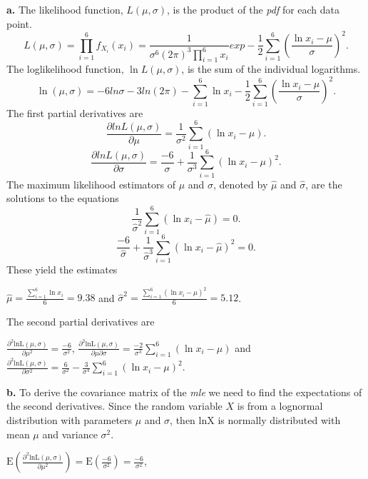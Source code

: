 \documentclass[]{book}
\theoremstyle{definition}
\theoremstyle{definition}
\theoremstyle{definition}
\theoremstyle{remark}
\begin{document}
\textbf{a.} The likelihood function, \(L\left( \mu,\sigma \right)\), is
the product of the \emph{pdf} for each data point.
\[L\left( \mu,\sigma \right) = \prod_{i = 1}^{6}{f_{X_{i}}\left( x_{i} \right)} = \frac{1}{\sigma^{6}\left( 2\pi \right)^{3}\prod_{i = 1}^{6}x_{i}}exp - \frac{1}{2}\sum_{i = 1}^{6}\left( \frac{\ln x_{i} - \mu}{\sigma} \right)^{2}.\]
The loglikelihood function, \(\ln L \left( \mu,\sigma \right)\), is the
sum of the individual logarithms.
\[\ln \left( \mu,\sigma \right) = - 6ln\sigma - 3ln\left( 2\pi \right) - \sum_{i = 1}^{6}\ln x_{i} - \frac{1}{2}\sum_{i = 1}^{6}\left( \frac{\ln x_{i} - \mu}{\sigma} \right)^{2}.\]
The first partial derivatives are
\[\frac{\partial lnL\left( \mu,\sigma \right)}{\partial\mu} = \frac{1}{\sigma^{2}}\sum_{i = 1}^{6}\left( \ln x_{i} - \mu \right).\]
\[\frac{\partial lnL\left( \mu,\sigma \right)}{\partial\sigma} = \frac{- 6}{\sigma} + \frac{1}{\sigma^{3}}\sum_{i = 1}^{6}\left( \ln x_{i} - \mu \right)^{2}.\]
The maximum likelihood estimators of \(\mu\) and \(\sigma\), denoted by
\(\hat{\mu}\) and \(\hat{\sigma}\), are the solutions to the equations
\[\frac{1}{{\hat{\sigma}}^{2}}\sum_{i = 1}^{6}\left( \ln x_{i} - \hat{\mu} \right) = 0.\]
\[\frac{- 6}{\hat{\sigma}} + \frac{1}{{\hat{\sigma}}^{3}}\sum_{i = 1}^{6}\left( \ln x_{i} - \hat{\mu} \right)^{2} = 0.\]
These yield the estimates

\(\hat{\mu} = \frac{\sum_{i = 1}^{6}{\ln x_{i}}}{6} = 9.38\) and
\({\hat{\sigma}}^{2} = \frac{\sum_{i = 1}^{6}\left( \ln x_{i} - \hat{\mu} \right)^{2}}{6} = 5.12\).

The second partial derivatives are

\(\frac{\partial^{2}\text{lnL}\left( \mu,\sigma \right)}{\partial\mu^{2}} = \frac{- 6}{\sigma^{2}}\),
\(\frac{\partial^{2}\text{lnL}\left( \mu,\sigma \right)}{\partial\mu\partial\sigma} = \frac{- 2}{\sigma^{3}}\sum_{i = 1}^{6}\left( \ln x_{i} - \mu \right)\)
and
\(\frac{\partial^{2}\text{lnL}\left( \mu,\sigma \right)}{\partial\sigma^{2}} = \frac{6}{\sigma^{2}} - \frac{3}{\sigma^{4}}\sum_{i = 1}^{6}\left( \ln x_{i} - \mu \right)^{2}\).

\textbf{b.} To derive the covariance matrix of the \emph{mle} we need to
find the expectations of the second derivatives. Since the random
variable \(X\) is from a lognormal distribution with parameters \(\mu\)
and \(\sigma\), then \(\text{lnX}\) is normally distributed with mean
\(\mu\) and variance \(\sigma^{2}\).

\(\mathrm{E}\left( \frac{\partial^{2}\text{lnL}\left( \mu,\sigma \right)}{\partial\mu^{2}} \right) = \mathrm{E}\left( \frac{- 6}{\sigma^{2}} \right) = \frac{- 6}{\sigma^{2}}\),
\end{document}
